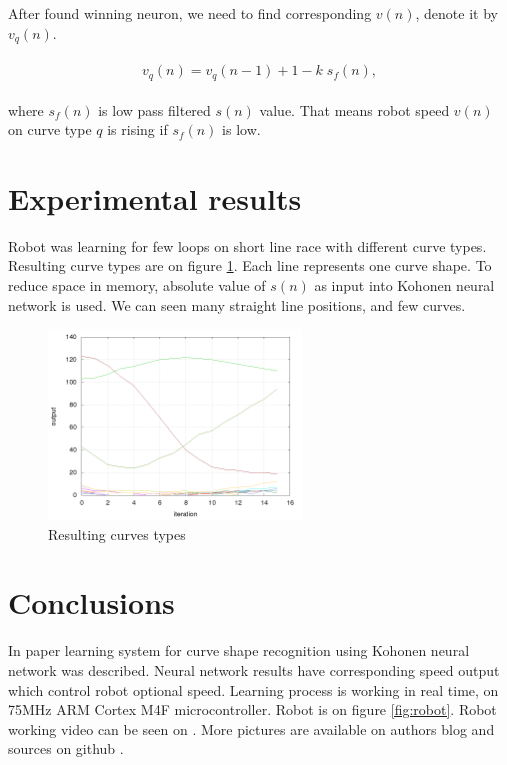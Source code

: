 \documentclass[twoside]{oss-conf-eng}
\begin{document}
After found winning neuron, we need to find corresponding $v(n)$, denote it by
$v_q(n)$.


\begin{eqnarray}
\begin{split}
\label{speed_estimating}
v_q(n) = v_q(n-1) + 1 - k\;s_f(n) ,
\end{split}
\end{eqnarray}

where $s_f(n)$ is low pass filtered $s(n)$ value.
That means robot speed $v(n)$ on curve type $q$ is rising if $s_f(n)$ is low.

\section{Experimental results}

Robot was learning for few loops on short line race with different curve types.
Resulting curve types are on figure \ref{fig:curves}. Each line represents
one curve shape. To reduce space in memory, absolute value of $s(n)$ as input into
Kohonen neural network is used. We can seen many straight line positions, and
few curves.

\begin{figure}[]
    \centering
    \includegraphics[width=0.6\textwidth]{prediction/predictor.png}
    \caption{Resulting curves types}
    \label{fig:curves}
\end{figure}

\section{Conclusions}

In paper  learning system for curve shape recognition using Kohonen
neural network was described. Neural network results have corresponding speed output which control
robot optional speed. Learning process is working in real time,
on 75MHz ARM Cortex M4F microcontroller. Robot is on figure \ref{fig:robot}.
Robot working video can be seen on \cite{robot_video}. More pictures are
available on authors blog \cite{blog} and sources on github \cite{git}.
\end{document}
